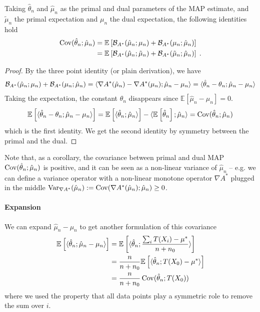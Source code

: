 \documentclass{article}
\newcommand*{\expect}[2][]{\ensuremath{\mathbb{E}_{#1} \left[ #2 \right] }} %
\newcommand{\logpart}{A}
\newcommand{\conj}{\logpart^*}
\newcommand{\bregmanconj}{\cB_{\logpart^*}}
\newcommand{\natp}{\theta}
\newcommand{\MAPm}{\hat \mu_n}
\newcommand{\MAPt}{\hat \natp_n}
\begin{document}
\begin{lemma}
\label{lem:covariance}
Taking  $\MAPt$ and $\MAPm$ as the primal and dual parameters of the MAP estimate, and $\tilde \mu_n$ the primal expectation and $\mu_n$ the dual expectation, the following identities hold
	\begin{align}
	\Cov(\hat \natp_n ; \MAPm )  
	&=\expect{\bregmanconj(\MAPm ; \mu_n)
	+ \bregmanconj(\mu_n ; \MAPm)} \\
	&=\expect{\bregmanconj(\MAPm ; \tilde \mu_n)
	+ \bregmanconj(\tilde \mu_n ; \MAPm)} \; .
\end{align}
\end{lemma}
\begin{proof}
By the three point identity (or plain derivation), we have 
\begin{align}
	\bregmanconj(\MAPm ; \mu_n)
	+ \bregmanconj(\mu_n ; \MAPm)
	= \langle \nabla \conj (\hat \mu_n) - \nabla \conj(\mu_n) ;  \hat \mu_n - \mu_n \rangle 
	= \langle \MAPt - \theta_n;  \MAPm- \mu_n \rangle 
\end{align}
Taking the expectation,  the constant $\theta_n$ disappears since $\expect{\hat \mu_n - \mu_n}=0$.
\begin{align}
	\expect{\langle \MAPt - \theta_n;  \MAPm- \mu_n \rangle } 
	 = \expect{\langle \MAPt; \MAPm \rangle} - \langle \expect{\MAPt} ; \MAPm \rangle
	= \Cov(\hat \natp_n ; \hat \mu_n ) 
\end{align}
which is the first identity. We get the second identity by symmetry between the primal and the dual.
\end{proof}

Note that, as a corollary, the covariance between primal and dual MAP
$\Cov(\hat \natp_n ; \hat \mu_n )$ is positive, and it can be seen as a non-linear variance of $\hat \mu_n$ -- e.g. we can define a variance operator with a non-linear monotone operator $\nabla\conj$ plugged in the middle $\Var_{\nabla \conj}(\hat \mu_n) := \Cov(\nabla\conj(\hat \mu_n) ; \hat \mu_n ) \geq 0$.

\paragraph{Expansion}
We can expand  $\hat \mu_n - \mu_n$ to get another formulation of this covariance
\begin{align}
	\expect{\langle \hat \natp_n ; \hat \mu_n - \mu_n \rangle}
	&= \expect{\langle \hat \natp_n ; \frac{\sum_i T(X_i) - \mu^*}{n+n_0} \rangle}  \\
	& = \frac{n}{n+n_0} \expect{\langle \hat \natp_n ; T(X_0) - \mu^*\rangle} \\
	&= \frac{n}{n+n_0} \Cov(\hat \natp_n ; T(X_0) ) 
	\label{eq:covariance_expansion}
\end{align}
where we used the property that all data points play a symmetric role to remove the sum over $i$.
\end{document}
